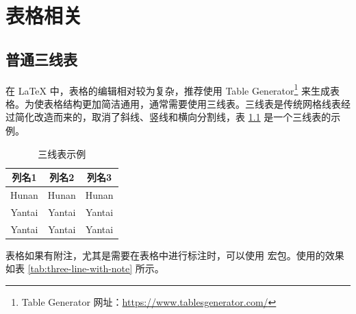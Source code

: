 \documentclass[
    report,     %
    oneside,    %
    UTF8,       %
    zihao=-4    %
]{config} %
\begin{document}


\chapter{表格相关}


\section{普通三线表}

在 \LaTeX{} 中，表格的编辑相对较为复杂，推荐使用 Table Generator\footnote{Table Generator 网址：\url{https://www.tablesgenerator.com/}} 来生成表格。为使表格结构更加简洁通用，通常需要使用三线表。三线表是传统网格线表经过简化改造而来的，取消了斜线、竖线和横向分割线，表 \ref{tab:three-line} 是一个三线表的示例。

\begin{table}[H] %
    \centering %
    \caption{三线表示例} %
    \label{tab:three-line} %
    \renewcommand\arraystretch{0.85} %
    \setlength{\tabcolsep}{12pt} %
    \begin{tabular}{ccc} %
        \toprule[1.5pt] %
        \textbf{列名1} & \textbf{列名2} & \textbf{列名3} \\ %
        \midrule[0.8pt] %
            Hunan & Hunan & Hunan \\ %
            Yantai & Yantai & Yantai \\ %
            Yantai & Yantai & Yantai \\ %
        \bottomrule[1.5pt] %
    \end{tabular}
\end{table}
\vspace{-0.5em}  %

表格如果有附注，尤其是需要在表格中进行标注时，可以使用  宏包。使用的效果如表 \ref{tab:three-line-with-note} 所示。
\end{document}
